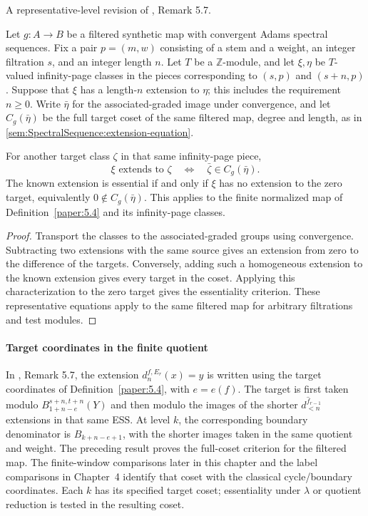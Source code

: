 \begin{remark}
\label{paper:5.7}
\label{def:fErextess}
A representative-level revision of \cite{LWX126}, Remark 5.7.

Let $g:A\to B$ be a filtered synthetic map with convergent Adams
spectral sequences. Fix a pair $p=(m,w)$ consisting of a stem and a
weight, an integer filtration $s$, and an integer length $n$. Let $T$ be a
$\mathbb Z$-module, and let $\xi,\eta$ be $T$-valued infinity-page
classes in the pieces corresponding to $(s,p)$ and $(s+n,p)$.
Suppose that $\xi$ has a length-$n$ extension to $\eta$; this includes
the requirement $n\geq0$. Write $\bar\eta$ for the associated-graded
image under convergence, and let $C_g(\bar\eta)$ be
the full target coset of the same filtered map, degree and length, as in
\ref{sem:SpectralSequence:extension-equation}.

For another target class $\zeta$ in that same infinity-page piece,
\[
\xi\text{ extends to }\zeta
\quad\Longleftrightarrow\quad
\bar\zeta\in C_g(\bar\eta).
\]
The known extension is essential if and only if $\xi$ has no extension
to the zero target, equivalently $0\notin C_g(\bar\eta)$.
This applies to the finite normalized map of
Definition~\ref{paper:5.4} and its infinity-page classes.
\end{remark}
\begin{proof}
Transport the classes to the associated-graded groups using
convergence. Subtracting two extensions with the same source gives an
extension from zero to the difference of the targets. Conversely, adding
such a homogeneous extension to the known extension gives every target
in the coset. Applying this characterization to the zero target gives
the essentiality criterion. These representative equations apply to the same filtered map
for arbitrary filtrations and test modules.
\end{proof}

\paragraph*{Target coordinates in the finite quotient}
In \cite{LWX126}, Remark 5.7, the extension
$d_n^{f,E_r}(x)=y$ is written using the target coordinates of
Definition~\ref{paper:5.4}, with $e=e(f)$. The target is first taken
modulo $B_{1+n-e}^{s+n,t+n}(Y)$ and then modulo the images of the
shorter $d_{<n}^{\widehat f_{r-1}}$ extensions in that same ESS.
At level $k$, the corresponding boundary denominator is
$B_{k+n-e+1}$, with the shorter images taken in the same quotient and
weight. The preceding result proves the full-coset criterion for the filtered
map. The finite-window comparisons later in this chapter and the label
comparisons in Chapter~4 identify that coset with the classical
cycle/boundary coordinates.
Each $k$ has its specified target coset; essentiality under $\lambda$
or quotient reduction is tested in the resulting coset.
